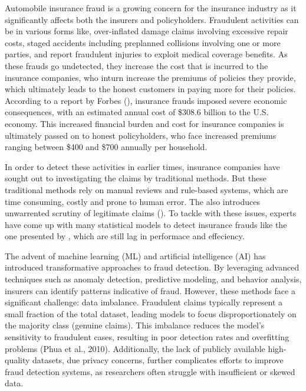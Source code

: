 \documentclass[twoside,11pt]{article}
\begin{document}
Automobile insurance fraud is a growing concern for the insurance industry as it significantly affects both the insurers and policyholders. Fraudulent activities can be in various forms like, over-inflated damage claims involving excessive repair costs, staged accidents including preplanned collisions involving one or more parties, and report fraudulent injuries to exploit medical coverage benefits. As these frauds go undetected, they increase the cost that is incurred to the insurance companies, who inturn increase the premiums of policies they provide, which ultimately leads to the honest customers in paying more for their policies. According to a report by Forbes (\citealp{kilroyInsuranceFraudStatistics2024}), insurance frauds imposed severe economic consequences, with an estimated annual cost of \$308.6 billion to the U.S. economy. This increased financial burden and cost for insurance companies is ultimately passed on to honest policyholders, who face increased premiums ranging between \$400 and \$700 annually per household.

In order to detect these activities in earlier times, insurance companies have sought out to investigating the claims by traditional methods. But these traditional methods rely on manual reviews and rule-based systems, which are time consuming, costly and prone to human error. The also introduces unwarrented scrutiny of legitimate claims (\citealp{AndreasRp,BERMUDEZ}). To tackle with these issues, experts have come up with many statistical models to detect insurance frauds like the one presented by \citealp{belhadjiModelDetectionInsurance2000}, which are still lag in performace and effeciency. 

The advent of machine learning (ML) and artificial intelligence (AI) has introduced transformative approaches to fraud detection. By leveraging advanced techniques such as anomaly detection, predictive modeling, and behavior analysis, insurers can identify patterns indicative of fraud. However, these methods face a significant challenge: data imbalance. Fraudulent claims typically represent a small fraction of the total dataset, leading models to focus disproportionately on the majority class (genuine claims). This imbalance reduces the model's sensitivity to fraudulent cases, resulting in poor detection rates and overfitting problems (Phua et al., 2010). Additionally, the lack of publicly available high-quality datasets, due privacy concerns, further complicates efforts to improve fraud detection systems, as researchers often struggle with insufficient or skewed data.
\end{document}
